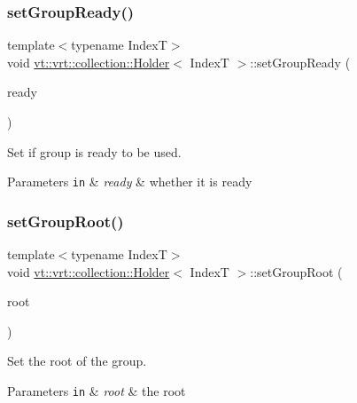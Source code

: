 \subsubsection{\texorpdfstring{set\+Group\+Ready()}{setGroupReady()}}
{\footnotesize\ttfamily template$<$typename IndexT$>$ \\
void \hyperlink{structvt_1_1vrt_1_1collection_1_1_holder}{vt\+::vrt\+::collection\+::\+Holder}$<$ IndexT $>$\+::set\+Group\+Ready (\begin{DoxyParamCaption}\item[{bool const}]{ready }\end{DoxyParamCaption})\hspace{0.3cm}{\ttfamily [inline]}}



Set if group is ready to be used. 


\begin{DoxyParams}[1]{Parameters}
\mbox{\tt in}  & {\em ready} & whether it is ready \\
\hline
\end{DoxyParams}
\mbox{\label{structvt_1_1vrt_1_1collection_1_1_holder_ac63fd92c5e7b93298fe464fcfcdbb1b6}} 
\subsubsection{\texorpdfstring{set\+Group\+Root()}{setGroupRoot()}}
{\footnotesize\ttfamily template$<$typename IndexT$>$ \\
void \hyperlink{structvt_1_1vrt_1_1collection_1_1_holder}{vt\+::vrt\+::collection\+::\+Holder}$<$ IndexT $>$\+::set\+Group\+Root (\begin{DoxyParamCaption}\item[{\hyperlink{namespacevt_a866da9d0efc19c0a1ce79e9e492f47e2}{Node\+Type} const}]{root }\end{DoxyParamCaption})\hspace{0.3cm}{\ttfamily [inline]}}



Set the root of the group. 


\begin{DoxyParams}[1]{Parameters}
\mbox{\tt in}  & {\em root} & the root \\
\hline
\end{DoxyParams}
\mbox{\label{structvt_1_1vrt_1_1collection_1_1_holder_ae169df5467202748f84a06f3b294c322}} 
